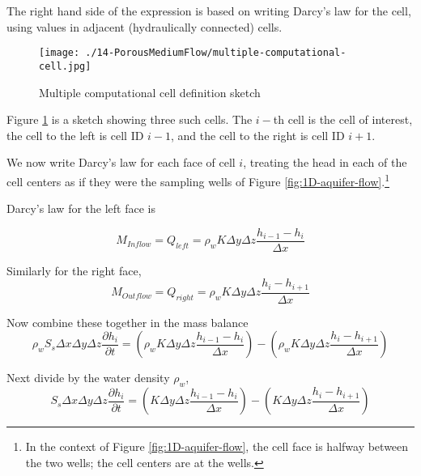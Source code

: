 The right hand side of the expression is based on writing Darcy's law for the cell, using values in adjacent (hydraulically connected) cells.

\begin{figure}[h!] %
   \centering
   \texttt{[image: ./14-PorousMediumFlow/multiple-computational-cell.jpg]} 
   \caption{Multiple computational cell definition sketch}
   \label{fig:multiple-computational-cell}
\end{figure}

Figure \ref{fig:multiple-computational-cell} is a sketch showing three such cells.  
The $i-$th cell is the cell of interest, the cell to the left is cell ID $i-1$, and the cell to the right is cell ID $i+1$.  

We now write Darcy's law for each face of cell $i$, treating the head in each of the cell centers as if they were the sampling wells of Figure \ref{fig:1D-aquifer-flow}.\footnote{In the context of Figure \ref{fig:1D-aquifer-flow}, the cell face is halfway between the two wells; the cell centers are at the wells.}

Darcy's law for the left face is 

\begin{equation}
M_{Inflow} = Q_{left} =\rho_{w} K \Delta y \Delta z \frac{h_{i-1} - h_{i}}{\Delta x}
\end{equation}
 
Similarly for the right face, 
 \begin{equation}
M_{Outflow} = Q_{right} =\rho_{w} K \Delta y \Delta z \frac{h_{i} - h_{i+1}}{\Delta x}
\end{equation}

Now combine these together in the mass balance
 \begin{equation}
\rho_{w} S_{s} \Delta x \Delta y \Delta z \frac{\partial h_i}{\partial t} = 
(\rho_{w} K \Delta y \Delta z \frac{h_{i-1} - h_{i}}{\Delta x}) - 
(\rho_{w} K \Delta y \Delta z \frac{h_{i} - h_{i+1}}{\Delta x})
\end{equation}

Next divide by the water density $\rho_{w}$,
 \begin{equation}
S_{s} \Delta x \Delta y \Delta z \frac{\partial h_i}{\partial t} = 
(K \Delta y \Delta z \frac{h_{i-1} - h_{i}}{\Delta x}) - 
(K \Delta y \Delta z \frac{h_{i} - h_{i+1}}{\Delta x})
\label{eqn:finite-difference-structure}
\end{equation}

